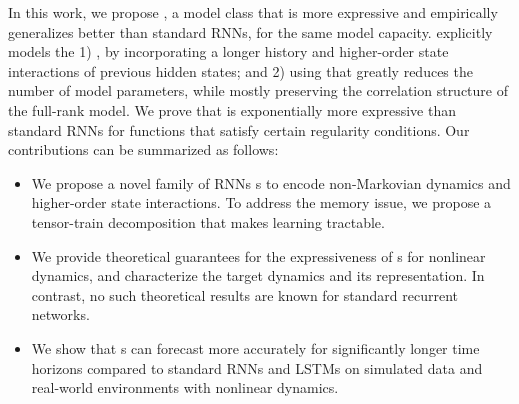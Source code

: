 In this work, we propose \trnn{}, a model class that is more expressive and empirically generalizes better than standard RNNs, for the same model capacity.
% 
%
\trnn{} explicitly models the 1) , by
%
incorporating a longer history  and higher-order state interactions of previous hidden states; and
%
2) using  that greatly reduces the number of model parameters, while mostly preserving the correlation structure of the full-rank model. 
%
We prove that
% 
\trnn{} is exponentially more expressive than standard RNNs for functions that satisfy certain regularity conditions. Our contributions can be summarized as follows:
%
\begin{itemize} %
\item We propose a novel family of RNNs \trnn{}s to encode non-Markovian dynamics and higher-order state interactions. To address the memory issue, we propose a tensor-train decomposition that makes learning tractable.
%
\item We provide theoretical guarantees for the expressiveness of \trnn{}s for nonlinear dynamics, and characterize the target dynamics and its \trnn{} representation. In contrast,  no such theoretical results are known for standard recurrent networks.
%
\item We show that \trnn{}s can forecast more accurately for significantly longer time horizons  compared to standard RNNs and LSTMs on simulated data and real-world environments with nonlinear dynamics.
% 
\end{itemize}
